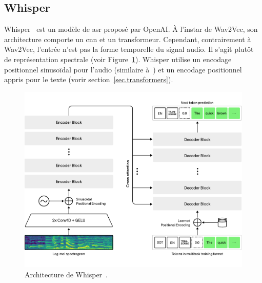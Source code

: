 \subsection{Whisper}

Whisper~\cite{Radford_Kim_Xu_Brockman_McLeavey_Sutskever_2022} est un modèle de \gls{asr} proposé par OpenAI.
À l'instar de Wav2Vec, son architecture comporte un \gls{cnn} et un transformeur.
Cependant, contrairement à Wav2Vec, l'entrée n'est pas la forme temporelle du signal audio.
Il s'agit plutôt de représentation spectrale (voir Figure~\ref{fig.whisper}).
Whisper utilise un encodage positionnel sinusoïdal pour l'audio (similaire à~\cite{attention})
et un encodage positionnel appris pour le texte (vorir section~\ref{sec.transformers}).

\begin{figure}[hbt]
    \centering
    \includegraphics[width=.5\linewidth]{assets/pdf/whisper.pdf}
    \caption[Architecture de Whisper.]
    {Architecture de Whisper~\cite{Radford_Kim_Xu_Brockman_McLeavey_Sutskever_2022}.}
    \label{fig.whisper}
\end{figure}